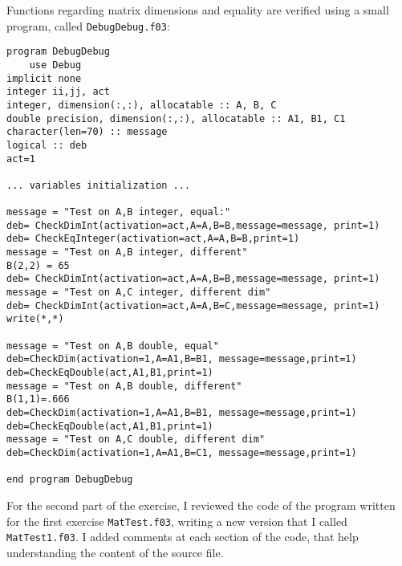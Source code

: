 \documentclass[a4paper]{article}
\begin{document}
Functions regarding matrix dimensions and equality are verified using a small program, called \lstinline{DebugDebug.f03}:
\begin{lstlisting}
program DebugDebug
    use Debug
implicit none
integer ii,jj, act
integer, dimension(:,:), allocatable :: A, B, C
double precision, dimension(:,:), allocatable :: A1, B1, C1
character(len=70) :: message
logical :: deb
act=1

... variables initialization ...

message = "Test on A,B integer, equal:"
deb= CheckDimInt(activation=act,A=A,B=B,message=message, print=1)
deb= CheckEqInteger(activation=act,A=A,B=B,print=1)
message = "Test on A,B integer, different"
B(2,2) = 65
deb= CheckDimInt(activation=act,A=A,B=B,message=message, print=1)
message = "Test on A,C integer, different dim"
deb= CheckDimInt(activation=act,A=A,B=C,message=message, print=1)
write(*,*)

message = "Test on A,B double, equal"
deb=CheckDim(activation=1,A=A1,B=B1, message=message,print=1)
deb=CheckEqDouble(act,A1,B1,print=1)
message = "Test on A,B double, different"
B(1,1)=.666
deb=CheckDim(activation=1,A=A1,B=B1, message=message,print=1)
deb=CheckEqDouble(act,A1,B1,print=1)
message = "Test on A,C double, different dim"
deb=CheckDim(activation=1,A=A1,B=C1, message=message,print=1)

end program DebugDebug
\end{lstlisting}
\bigskip

For the second part of the exercise, I reviewed the code of the program written for the first exercise \lstinline{MatTest.f03}, writing a new version that I called \lstinline{MatTest1.f03}.
I added comments at each section of the code, that help understanding the content of the source file.
\end{document}
